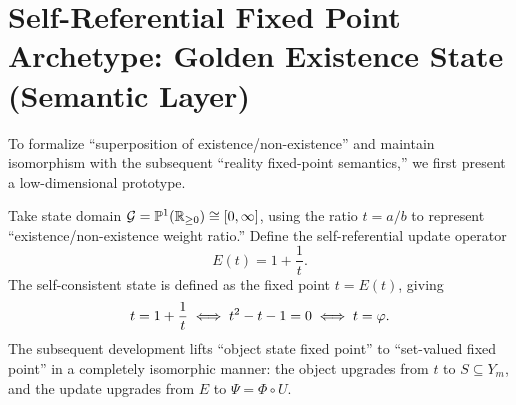 \section{Self-Referential Fixed Point Archetype: Golden Existence State (Semantic Layer)}

To formalize ``superposition of existence/non-existence'' and maintain isomorphism with the subsequent ``reality fixed-point semantics,'' we first present a low-dimensional prototype.

Take state domain $\mathcal{G}=\mathbb{P}^{1}(\mathbb{R}_{\ge 0})\cong[0,\infty]$, using the ratio $t=a/b$ to represent ``existence/non-existence weight ratio.'' Define the self-referential update operator
\[
E(t)=1+\frac{1}{t}.
\]
The self-consistent state is defined as the fixed point $t=E(t)$, giving
\[
t=1+\frac{1}{t}\iff t^2-t-1=0\iff t=\varphi.
\]
The subsequent development lifts ``object state fixed point'' to ``set-valued fixed point'' in a completely isomorphic manner: the object upgrades from $t$ to $S\subseteq Y_m$, and the update upgrades from $E$ to $\Psi=\Phi\circ U$.
